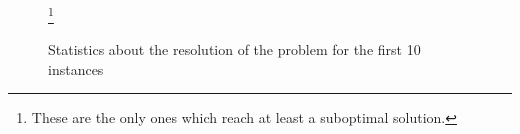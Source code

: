 \begin{figure}[H]
    \caption{Statistics about the resolution of the problem for the first 10 instances}
    \label{fig:sat_plots}\footnote{These are the only ones which reach at least a suboptimal solution.}
\end{figure}
